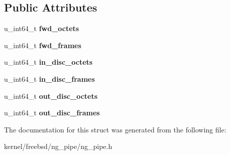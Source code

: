 \subsection*{Public Attributes}
\begin{DoxyCompactItemize}
\item 
\hypertarget{structng__pipe__hookstat_a1f459b7fce4a051a49b2f251db81642f}{u\+\_\+int64\+\_\+t {\bfseries fwd\+\_\+octets}}\label{structng__pipe__hookstat_a1f459b7fce4a051a49b2f251db81642f}

\item 
\hypertarget{structng__pipe__hookstat_aa5d7b833c27c6a38e985a9cdefed8efa}{u\+\_\+int64\+\_\+t {\bfseries fwd\+\_\+frames}}\label{structng__pipe__hookstat_aa5d7b833c27c6a38e985a9cdefed8efa}

\item 
\hypertarget{structng__pipe__hookstat_a2f284e18504c76ddf1d4dddd1f4e1198}{u\+\_\+int64\+\_\+t {\bfseries in\+\_\+disc\+\_\+octets}}\label{structng__pipe__hookstat_a2f284e18504c76ddf1d4dddd1f4e1198}

\item 
\hypertarget{structng__pipe__hookstat_a8f08a82a5a14e1891cd6002de1689ead}{u\+\_\+int64\+\_\+t {\bfseries in\+\_\+disc\+\_\+frames}}\label{structng__pipe__hookstat_a8f08a82a5a14e1891cd6002de1689ead}

\item 
\hypertarget{structng__pipe__hookstat_a1c637a36cdf2723e4f9fce4e5d8f998f}{u\+\_\+int64\+\_\+t {\bfseries out\+\_\+disc\+\_\+octets}}\label{structng__pipe__hookstat_a1c637a36cdf2723e4f9fce4e5d8f998f}

\item 
\hypertarget{structng__pipe__hookstat_a480df882448fd9cd23bf75dda2d09cbb}{u\+\_\+int64\+\_\+t {\bfseries out\+\_\+disc\+\_\+frames}}\label{structng__pipe__hookstat_a480df882448fd9cd23bf75dda2d09cbb}

\end{DoxyCompactItemize}


The documentation for this struct was generated from the following file\+:\begin{DoxyCompactItemize}
\item 
kernel/freebsd/ng\+\_\+pipe/ng\+\_\+pipe.\+h\end{DoxyCompactItemize}
